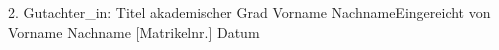 \begin{titlepage}
\begin{center}
        2. Gutachter\_in: Titel akademischer Grad Vorname Nachname\linebreak[4]
        \linebreak[4]
        \linebreak[4]
        \linebreak[4]
        \linebreak[4]
        Eingereicht von Vorname Nachname [Matrikelnr.]
        \linebreak[4]
        \linebreak[4]
        \linebreak[4]
        \linebreak[4]
        Datum

    \end{center}
\end{titlepage}